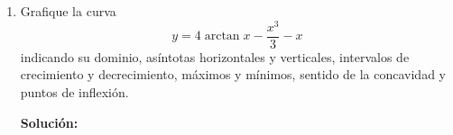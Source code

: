 \documentclass[12pt]{article}
\newenvironment{solucion}
{\begin{mdframed}[backgroundcolor=black!10]
		{\bf Solución:}\\
	}
	{
	\end{mdframed}
}
\newenvironment{preguntas}
{\begin{enumerate}\itemsep12pt
	}
	{
	\end{enumerate}
}
\begin{document}
\begin{preguntas}
\begin{solucion}
\begin{enumerate}[a)]
\item 
\item 
\end{enumerate}
\end{solucion}
\item Grafique la curva
$$y = 4\arctan x - \dfrac{x^3}{3} - x$$
indicando su dominio, asíntotas horizontales y verticales, intervalos de crecimiento y decrecimiento, máximos y mínimos, sentido de la concavidad y puntos de inflexión.
\begin{solucion}

\end{solucion}
\end{preguntas}
\end{document}
